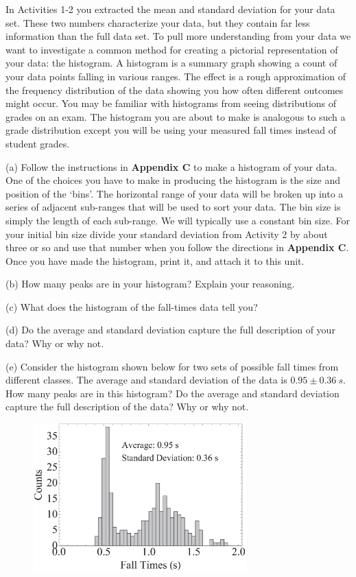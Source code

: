 In Activities 1-2 you extracted the mean and standard deviation for your data set. 
These two numbers characterize your data, but they contain far less information than the full
data set.
To pull more understanding from your data we want to investigate a common method for
creating a pictorial representation of your data: the histogram.
A histogram is a summary graph showing a count of your data points falling in various ranges. 
The effect is a rough approximation of the frequency distribution of the data showing you how often different outcomes might occur.
You may be familiar with histograms from seeing distributions of grades on an exam.
The histogram you are about to make is analogous to such a grade distribution except you will be using your measured fall times
instead of student grades.

(a) Follow the instructions in \textbf{Appendix C} to make a histogram of your data. 
One of the choices you have to make in producing the histogram is the size and position of the `bins'.
The horizontal range of your data will be broken up into a series of adjacent sub-ranges that will be used
to sort your data. The bin size is simply the length of each sub-range. 
We will typically use a constant bin size.
For your initial bin size divide your standard deviation from Activity 2 by about three or so and use that number when you follow the directions in
\textbf{Appendix C}.
Once you have made the histogram, print it, and attach it to this unit.
\vspace{2mm}

(b) How many peaks are in your histogram? Explain your reasoning.
\vspace{10mm}

(c) What does the histogram of the fall-times data tell you?
\vspace{15mm}

(d) Do the average and standard deviation capture the full description of your data? Why or why not.
\vspace{15mm}

(e) Consider the histogram shown below for two sets of possible fall times from different classes. 
The average and standard deviation of the data is $0.95\pm 0.36 ~ s$. How many peaks are in this
histogram? Do the average and standard deviation capture the full description of the data? Why or why not.

\begin{figure}[hb]
\includegraphics[height=2.25in]{measurement_uncertainty/SampleHist1_bw.eps}\label{SampleHist1}
\end{figure}

